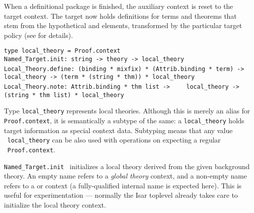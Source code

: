 \begin{isabellebody}
\begin{isamarkuptext}
  When a definitional package is finished, the auxiliary context is
  reset to the target context.  The target now holds definitions for
  terms and theorems that stem from the hypothetical \isa{{\isasymDEFINE}} and \isa{{\isasymNOTE}} elements, transformed by the
  particular target policy (see \cite[\S4--5]{Haftmann-Wenzel:2009}
  for details).%
\end{isamarkuptext}%
\isamarkuptrue%
%
\isadelimmlref
%
\endisadelimmlref
%
\isatagmlref
%
\begin{isamarkuptext}%
\begin{mldecls}
  \verb|type local_theory = Proof.context| \\
  \verb|Named_Target.init: string -> theory -> local_theory| \\[1ex]
  \verb|Local_Theory.define: (binding * mixfix) * (Attrib.binding * term) ->|\isasep\isanewline%
\verb|    local_theory -> (term * (string * thm)) * local_theory| \\
  \verb|Local_Theory.note: Attrib.binding * thm list ->|\isasep\isanewline%
\verb|    local_theory -> (string * thm list) * local_theory| \\
  \end{mldecls}

  \begin{description}

  \item Type \verb|local_theory| represents local theories.
  Although this is merely an alias for \verb|Proof.context|, it is
  semantically a subtype of the same: a \verb|local_theory| holds
  target information as special context data.  Subtyping means that
  any value ~\verb|local_theory| can be also used
  with operations on expecting a regular ~\verb|Proof.context|.

  \item \verb|Named_Target.init|~ initializes a local
  theory derived from the given background theory.  An empty name
  refers to a \emph{global theory} context, and a non-empty name
  refers to a \hyperlink{command.locale}{\mbox{}} or \hyperlink{command.class}{\mbox{}} context (a
  fully-qualified internal name is expected here).  This is useful for
  experimentation --- normally the Isar toplevel already takes care to
  initialize the local theory context.


\end{description}
\end{isamarkuptext}
\end{isabellebody}
